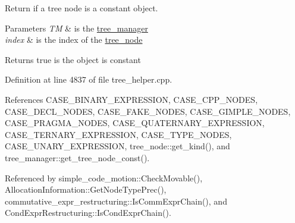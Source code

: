 Return if a tree node is a constant object. 


\begin{DoxyParams}{Parameters}
{\em TM} & is the \hyperlink{classtree__manager}{tree\+\_\+manager} \\
\hline
{\em index} & is the index of the \hyperlink{classtree__node}{tree\+\_\+node} \\
\hline
\end{DoxyParams}
\begin{DoxyReturn}{Returns}
true is the object is constant 
\end{DoxyReturn}


Definition at line 4837 of file tree\+\_\+helper.\+cpp.



References C\+A\+S\+E\+\_\+\+B\+I\+N\+A\+R\+Y\+\_\+\+E\+X\+P\+R\+E\+S\+S\+I\+ON, C\+A\+S\+E\+\_\+\+C\+P\+P\+\_\+\+N\+O\+D\+ES, C\+A\+S\+E\+\_\+\+D\+E\+C\+L\+\_\+\+N\+O\+D\+ES, C\+A\+S\+E\+\_\+\+F\+A\+K\+E\+\_\+\+N\+O\+D\+ES, C\+A\+S\+E\+\_\+\+G\+I\+M\+P\+L\+E\+\_\+\+N\+O\+D\+ES, C\+A\+S\+E\+\_\+\+P\+R\+A\+G\+M\+A\+\_\+\+N\+O\+D\+ES, C\+A\+S\+E\+\_\+\+Q\+U\+A\+T\+E\+R\+N\+A\+R\+Y\+\_\+\+E\+X\+P\+R\+E\+S\+S\+I\+ON, C\+A\+S\+E\+\_\+\+T\+E\+R\+N\+A\+R\+Y\+\_\+\+E\+X\+P\+R\+E\+S\+S\+I\+ON, C\+A\+S\+E\+\_\+\+T\+Y\+P\+E\+\_\+\+N\+O\+D\+ES, C\+A\+S\+E\+\_\+\+U\+N\+A\+R\+Y\+\_\+\+E\+X\+P\+R\+E\+S\+S\+I\+ON, tree\+\_\+node\+::get\+\_\+kind(), and tree\+\_\+manager\+::get\+\_\+tree\+\_\+node\+\_\+const().



Referenced by simple\+\_\+code\+\_\+motion\+::\+Check\+Movable(), Allocation\+Information\+::\+Get\+Node\+Type\+Prec(), commutative\+\_\+expr\+\_\+restructuring\+::\+Is\+Comm\+Expr\+Chain(), and Cond\+Expr\+Restructuring\+::\+Is\+Cond\+Expr\+Chain().

